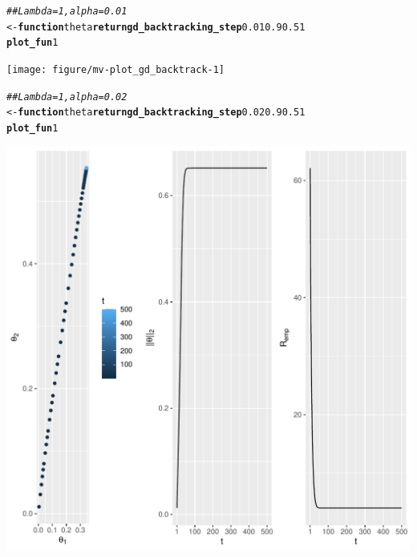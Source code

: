 \documentclass[a4paper]{article}
\makeatletter
\newcommand{\hlnum}[1]{\textcolor[rgb]{0.686,0.059,0.569}{#1}}%
\newcommand{\hlcom}[1]{\textcolor[rgb]{0.678,0.584,0.686}{\textit{#1}}}%
\newcommand{\hlkwa}[1]{\textcolor[rgb]{0.161,0.373,0.58}{\textbf{#1}}}%
\newcommand{\hlkwb}[1]{\textcolor[rgb]{0.69,0.353,0.396}{#1}}%
\newcommand{\hlkwc}[1]{\textcolor[rgb]{0.333,0.667,0.333}{#1}}%
\newcommand{\hlkwd}[1]{\textcolor[rgb]{0.737,0.353,0.396}{\textbf{#1}}}%
\newenvironment{kframe}{%
 \def\at@end@of@kframe{}%
 \ifinner\ifhmode%
  \def\at@end@of@kframe{\end{minipage}}%
  \begin{minipage}{\columnwidth}%
 \fi\fi%
 \def\FrameCommand##1{\hskip\@totalleftmargin \hskip-\fboxsep
 \colorbox{shadecolor}{##1}\hskip-\fboxsep
     \hskip-\linewidth \hskip-\@totalleftmargin \hskip\columnwidth}%
 \MakeFramed {\advance\hsize-\width
   \@totalleftmargin\z@ \linewidth\hsize
   \@setminipage}}%
 {\par\unskip\endMakeFramed%
 \at@end@of@kframe}
\newenvironment{knitrout}{}{} %
\makeatother
\begin{document}
{\begin{enumerate}
\begin{knitrout}
\begin{kframe}
\begin{alltt}
\hlcom{## Lambda = 1, alpha = 0.01}
 \hlkwb{<-} \hlkwa{function}\hldef{(}\hlkwc{theta}\hldef{)} \hlkwd{return}\hldef{(}\hlkwd{gd_backtracking_step} \hlnum{0.01}\hldef{,} \hlnum{0.9}\hldef{,} \hlnum{0.5}\hldef{,} \hlnum{1}\hldef{))}
\hlkwd{plot_fun} \hlnum{1}\hldef{)}
\end{alltt}
\end{kframe}
\texttt{[image: figure/mv-plot\_gd\_backtrack-1]} 
\begin{kframe}\begin{alltt}
\hlcom{## Lambda = 1, alpha = 0.02}
 \hlkwb{<-} \hlkwa{function}\hldef{(}\hlkwc{theta}\hldef{)} \hlkwd{return}\hldef{(}\hlkwd{gd_backtracking_step} \hlnum{0.02}\hldef{,} \hlnum{0.9}\hldef{,} \hlnum{0.5}\hldef{,} \hlnum{1}\hldef{))}
\hlkwd{plot_fun} \hlnum{1}\hldef{)}
\end{alltt}
\end{kframe}
\includegraphics[width=0.5\linewidth]{figure/mv-plot_gd_backtrack-2} 
\end{knitrout}
\end{enumerate}
}
\end{document}
